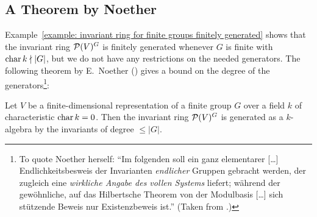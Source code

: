 \subsection{A Theorem by Noether}


\begin{fluff}
  Example~\ref{example: invariant ring for finite groups finitely generated} shows that the invariant ring $\mathcal{P}(V)^G$ is finitely generated whenever $G$ is finite with $\operatorname{char}{k} \nmid |G|$, but we do not have any restrictions on the needed generators.
  The following theorem by E.\ Noether (\cite{Noether1915}) gives a bound on the degree of the generators\footnote{
  To quote Noether herself:
  \enquote{Im folgenden soll ein ganz elementarer [\dots] Endlichkeitsbesweis der Invarianten \emph{endlicher} Gruppen gebracht werden, der zugleich eine \emph{wirkliche Angabe des vollen Systems} liefert;
  während der gewöhnliche, auf das Hilbertsche Theorem von der Modulbasis […] sich stützende Beweis nur Existenzbeweis ist.}
  (Taken from \cite{Noether1915}.)
  }:
\end{fluff}


\begin{theorem}[Noether]
  Let $V$ be a finite-dimensional representation of a finite group $G$ over a field $k$ of characteristic $\operatorname{char}{k} = 0$.
  Then the invariant ring $\mathcal{P}(V)^G$ is generated as a $k$-algebra by the invariants of degree $\leq |G|$.
\end{theorem}


